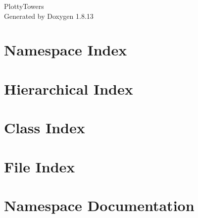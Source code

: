 \documentclass[twoside]{book}
\newcommand{\+}{\discretionary{\mbox{\scriptsize$\hookleftarrow$}}{}{}}
\newcommand{\clearemptydoublepage}{%
  \newpage{\pagestyle{empty}\cleardoublepage}%
}
\begin{document}
\hypersetup{pageanchor=false,
             bookmarksnumbered=true,
             pdfencoding=unicode
            }
\begin{titlepage}
\vspace*{7cm}
\begin{center}%
{\Large Plotty\+Towers }\\
\vspace*{1cm}
{\large Generated by Doxygen 1.8.13}\\
\end{center}
\end{titlepage}
\clearemptydoublepage
{}
\tableofcontents
\clearemptydoublepage
{}
\hypersetup{pageanchor=true}

\chapter{Namespace Index}

\chapter{Hierarchical Index}

\chapter{Class Index}

\chapter{File Index}

\chapter{Namespace Documentation}










\end{document}
